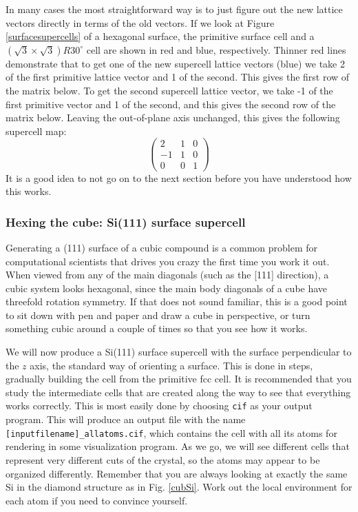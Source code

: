 \documentclass[11pt]{article}
\begin{document}
In many cases the most straightforward way is to just figure out the new lattice vectors directly in terms of the old vectors. If we look at Figure \ref{surfacesupercells} of a hexagonal surface, the primitive surface cell and a $(\sqrt{3} \times \sqrt{3})R30^{\circ}$ cell are shown in red and blue, respectively. Thinner red lines demonstrate that to get one of the new supercell lattice vectors (blue) we take 2 of the first primitive lattice vector and 1 of the second. This gives the first row of the matrix below. To get the second supercell lattice vector, we take -1 of the first primitive vector and 1 of the second, and this gives the second row of the matrix below.
Leaving the out-of-plane axis unchanged, this gives the following supercell map:
\begin{equation}
\begin{pmatrix}
2 & 1 & 0\\
-1 & 1 & 0\\
0 & 0 & 1
\end{pmatrix}
\end{equation}
It is a good idea to not go on to the next section before you have understood how this works.

\subsubsection{Hexing the cube: Si(111) surface supercell}
Generating a (111) surface of a cubic compound is a common problem for computational scientists that drives you crazy the first time you work it out. When viewed from any of the main diagonals (such as the [111] direction), a cubic system looks hexagonal, since the main body diagonals of a cube have threefold rotation symmetry. If that does not sound familiar, this is a good point to sit down with pen and paper and draw a cube in perspective, or turn something cubic around a couple of times so that you see how it works.

We will now produce a Si(111) surface supercell with the surface perpendicular to the $z$ axis, the standard way of orienting a surface. This is done in steps, gradually building the cell from the primitive fcc cell. It is recommended that you study the intermediate cells that are created along the way to  see that everything works correctly. This is most easily done by choosing \texttt{cif} as your output program. This will produce an output file with the name \texttt{[inputfilename]\_allatoms.cif}, which contains the cell with all its atoms for rendering in some visualization program. As we go, we will see different cells that represent very different cuts of the crystal, so the atoms may appear to be organized differently. Remember that you are always looking at exactly the same Si in the diamond structure as in Fig. \ref{cubSi}. Work out the local environment for each atom if you need to convince yourself.
\end{document}
